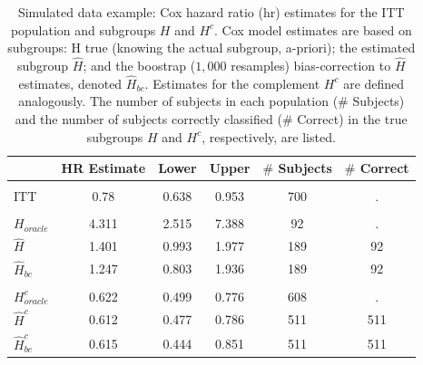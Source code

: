 \documentclass[smallextended]{svjour3}
\begin{document}
\begin{table}

\caption{\label{tab:simex_tab}\label{tab:simex} Simulated data example: Cox hazard ratio (hr) estimates for the ITT population and subgroups $H$ and $H^{c}$.
Cox model estimates are based on subgroups: H true (knowing the actual subgroup, a-priori); the estimated subgroup $\hat{H}$; and 
the boostrap ($1,000$ resamples) bias-correction to $\hat{H}$ estimates, denoted $\hat{H}_{bc}$.  Estimates for the complement $H^{c}$ are defined analogously.
The number of subjects in each population ($\#$ Subjects) and the number of subjects correctly classified ($\#$ Correct) in the true subgroups $H$ and $H^{c}$, respectively, are listed.}
\centering
\fontsize{9}{11}\selectfont
\begin{tabular}[t]{lccccc}
\toprule
  & HR Estimate & Lower & Upper & $\#$ Subjects & $\#$ Correct\\
\midrule
\addlinespace[0.3em]
\multicolumn{6}{l}{\textbf{ITT}}\\
\hspace{1em}ITT & 0.78 & 0.638 & 0.953 & 700 & .\\
\addlinespace[0.3em]
\multicolumn{6}{l}{\textbf{H subgroup estimates}}\\
\hspace{1em}$H_{oracle}$ & 4.311 & 2.515 & 7.388 & 92 & .\\
\hspace{1em}$\hat{H}$ & 1.401 & 0.993 & 1.977 & 189 & 92\\
\hspace{1em}$\hat{H}_{bc}$ & 1.247 & 0.803 & 1.936 & 189 & 92\\
\addlinespace[0.3em]
\multicolumn{6}{l}{\textbf{H-complement subgroup estimates}}\\
\hspace{1em}$H^{c}_{oracle}$ & 0.622 & 0.499 & 0.776 & 608 & .\\
\hspace{1em}$\hat{H}^{c}$ & 0.612 & 0.477 & 0.786 & 511 & 511\\
\hspace{1em}$\hat{H}^{c}_{bc}$ & 0.615 & 0.444 & 0.851 & 511 & 511\\
\bottomrule
\end{tabular}
\end{table}





\end{document}
